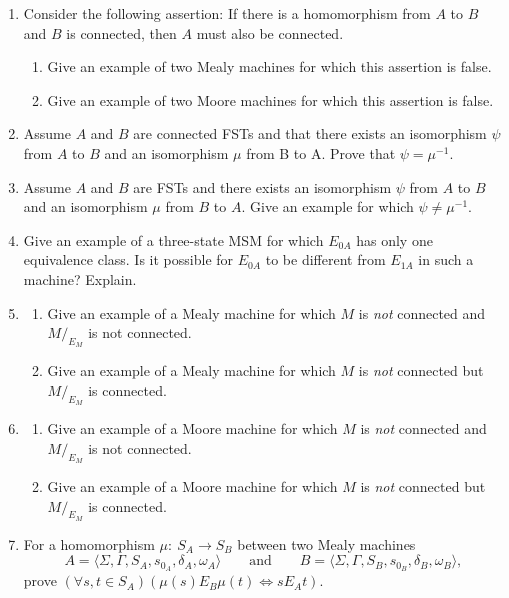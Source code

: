 \begin{enumerate}[{7.}1.]
\item Consider the following assertion: If there is a homomorphism from $A$ to
$B$ and $B$ is connected, then $A$ must also be connected.
\begin{enumerate}
\item Give an example of two Mealy machines for which this assertion is false.
\item Give an example of two Moore machines for which this assertion is false.
\end{enumerate}

\item Assume $A$ and $B$ are connected FSTs and that there exists an isomorphism
$\psi$ from $A$ to $B$ and an isomorphism $\mu$ from B to A. Prove that $\psi =
\mu^{-1}$.

\item Assume $A$ and $B$ are FSTs and there exists an isomorphism $\psi$ from
$A$ to $B$ and an isomorphism $\mu$ from $B$ to $A$. Give an example for which
$\psi \not= \mu^{-1}$.

\item Give an example of a three-state MSM for which $E_{0A}$ has only one
equivalence class. Is it possible for $E_{0A}$ to be different from $E_{1A}$ in
such a machine? Explain.

\item \begin{enumerate}
\item Give an example of a Mealy machine for which $M$ is \emph{not} connected
and $M/  _{E_M}$ is not connected.
\item Give an example of a Mealy machine for which $M$ is \emph{not} connected
but $M/  _{E_M}$ is connected.
\end{enumerate}

\item \begin{enumerate}
\item Give an example of a Moore machine for which $M$ is \emph{not} connected
and $M/  _{E_M}$ is not connected.
\item Give an example of a Moore machine for which $M$ is \emph{not} connected
but $M/  _{E_M}$ is connected.
\end{enumerate}

\item For a homomorphism $\mu$$:\ S_A \rightarrow S_B$ between two Mealy machines
\[ A=\langle\Sigma,\Gamma,S_A,s_{0_A},\delta_A,\omega_A\rangle\qquad\text{and}
	\qquad B=\langle\Sigma,\Gamma,S_B,s_{0_B},\delta_B,\omega_B\rangle, \]
prove $(\forall s,t \in S_A)(\mu(s) E_B \mu(t) \Leftrightarrow s E_A t)$.


\end{enumerate}
